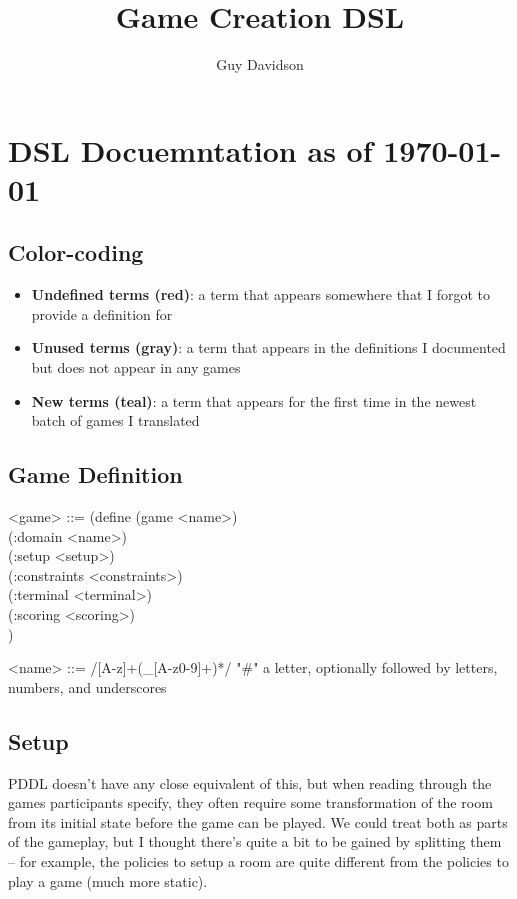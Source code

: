 \documentclass{article}
\title{Game Creation DSL}
\author{Guy Davidson}
\begin{document}
\maketitle

\section{DSL Docuemntation as of \today}

\subsection*{Color-coding}
\begin{itemize}
\item {\color{red} \textbf{Undefined terms (red)}}: a term that appears somewhere that I forgot to provide a definition for
\item {\color{gray} \textbf{Unused terms (gray)}}: a term that appears in the definitions I documented but does not appear in any games
\item {\color{teal} \textbf{New terms (teal)}}: a term that appears for the first time in the newest batch of games I translated
\end{itemize}
\subsection{Game Definition}
\begin{grammar}
<game> ::= (define (game <name>) \\
  (:domain <name>) \\
  (:setup <setup>) \\
  (:constraints <constraints>) \\
  (:terminal <terminal>) \\
  (:scoring <scoring>) \\)

<name> ::= /[A-z]+(_[A-z0-9]+)*/ "#" a letter, optionally followed by letters, numbers, and underscores
\end{grammar}

\subsection{Setup}
PDDL doesn't have any close equivalent of this, but when reading through the games participants specify, 
        they often require some transformation of the room from its initial state before the game can be played.
        We could treat both as parts of the gameplay, but I thought there's quite a bit to be gained by splitting them -- for example,
        the policies to setup a room are quite different from the policies to play a game (much more static). \\
\end{document}
